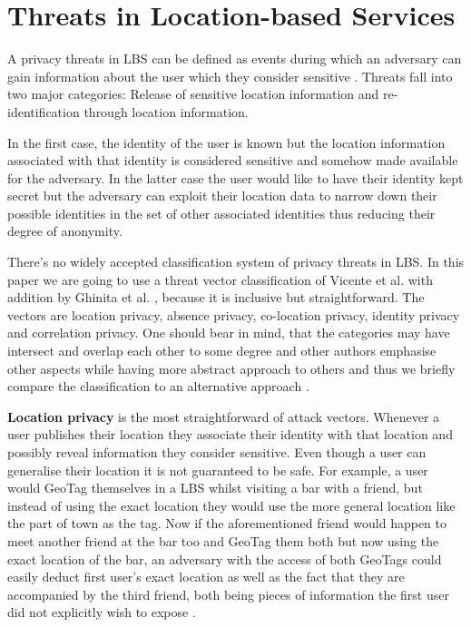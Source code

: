 \documentclass[english]{tktltiki2}
\theoremstyle{definition}
\theoremstyle{remark}
\begin{document}
\section{Threats in Location-based Services}

A privacy threats in LBS can be defined as events during which an adversary can gain information about the user which they consider sensitive \cite{LocationPrivacy}. Threats fall into two major categories: Release of sensitive location information and re-identification through location information. \par In the first case, the identity of the user is known but the location information associated with that identity is considered sensitive and somehow made available for the adversary. In the latter case the user would like to have their identity kept secret but the adversary can exploit their location data to narrow down their possible identities in the set of other associated identities thus reducing their degree of anonymity. \par There's no widely accepted classification system of privacy threats in LBS. In this paper we are going to use a threat vector classification of Vicente et al. with addition by Ghinita et al. \cite{LocationPrivacy, Ghinita2008}, because it is inclusive but straightforward. The vectors are location privacy, absence privacy, co-location privacy, identity privacy and correlation privacy. One should bear in mind, that the categories may have intersect and overlap each other to some degree and other authors emphasise other aspects while having more abstract approach to others and thus we briefly compare the classification to an alternative approach \cite{Bettini2009}.

\textbf{Location privacy} is the most straightforward of attack vectors. Whenever a user publishes their location they associate their identity with that location and possibly reveal information they consider sensitive. Even though a user can generalise their location it is not guaranteed to be safe. For example, a user would GeoTag themselves in a LBS whilst visiting a bar with a friend, but instead of using the exact location they would use the more general location like the part of town as the tag. Now if the aforementioned friend would happen to meet another friend at the bar too and GeoTag them both but now using the exact location of the bar, an adversary with the access of both GeoTags could easily deduct first user's exact location as well as the fact that they are accompanied by the third friend, both being pieces of information the first user did not explicitly wish to expose \cite{LocationPrivacy}.
\end{document}
